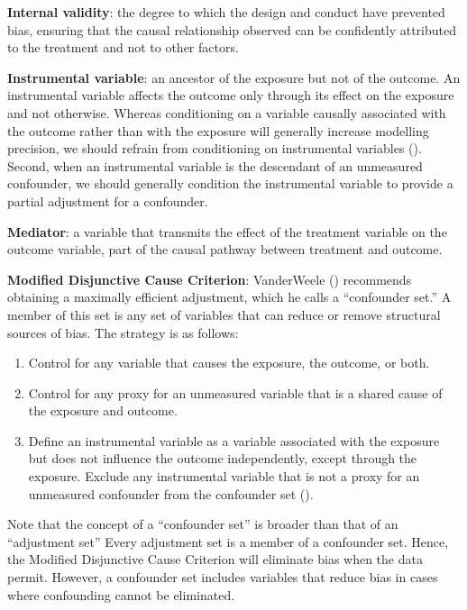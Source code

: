 \documentclass[
  singlecolumn]{article}
\providecommand{\tightlist}{%
  \setlength{\itemsep}{0pt}\setlength{\parskip}{0pt}}\usepackage{longtable,booktabs,array}
\begin{document}
\textbf{Internal validity}: the degree to which the design and conduct
have prevented bias, ensuring that the causal relationship observed can
be confidently attributed to the treatment and not to other factors.

\textbf{Instrumental variable}: an ancestor of the exposure but not of
the outcome. An instrumental variable affects the outcome only through
its effect on the exposure and not otherwise. Whereas conditioning on a
variable causally associated with the outcome rather than with the
exposure will generally increase modelling precision, we should refrain
from conditioning on instrumental variables
(). Second, when
an instrumental variable is the descendant of an unmeasured confounder,
we should generally condition the instrumental variable to provide a
partial adjustment for a confounder.

\textbf{Mediator}: a variable that transmits the effect of the treatment
variable on the outcome variable, part of the causal pathway between
treatment and outcome.

\textbf{Modified Disjunctive Cause Criterion}: VanderWeele
() recommends obtaining a maximally
efficient adjustment, which he calls a ``confounder set.'' A member of
this set is any set of variables that can reduce or remove structural
sources of bias. The strategy is as follows:

\begin{enumerate}
\def\labelenumi{\alph{enumi}.}
\tightlist
\item
  Control for any variable that causes the exposure, the outcome, or
  both.
\item
  Control for any proxy for an unmeasured variable that is a shared
  cause of the exposure and outcome.
\item
  Define an instrumental variable as a variable associated with the
  exposure but does not influence the outcome independently, except
  through the exposure. Exclude any instrumental variable that is not a
  proxy for an unmeasured confounder from the confounder set
  ().
\end{enumerate}

Note that the concept of a ``confounder set'' is broader than that of an
``adjustment set'' Every adjustment set is a member of a confounder set.
Hence, the Modified Disjunctive Cause Criterion will eliminate bias when
the data permit. However, a confounder set includes variables that
reduce bias in cases where confounding cannot be eliminated.
\end{document}
